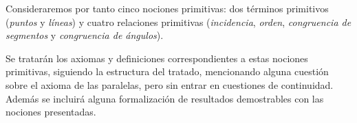 Consideraremos por tanto cinco nociones primitivas: dos términos primitivos
(\textit{puntos} y \textit{líneas}) y cuatro relaciones primitivas
(\textit{incidencia}, \textit{orden}, \textit{congruencia de segmentos} y
\textit{congruencia de ángulos}).


Se tratarán los axiomas y definiciones correspondientes a estas nociones
primitivas, siguiendo la estructura del tratado, mencionando alguna cuestión
sobre el axioma de las paralelas, pero sin entrar en cuestiones de continuidad.
Además se incluirá alguna formalización de resultados demostrables con las
nociones presentadas.



